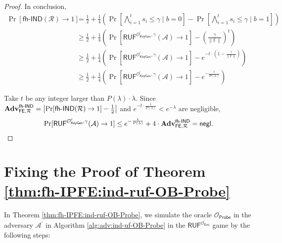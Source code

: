 \begin{proof}
In conclusion,
\begin{align*}
	\Pr[\textsf{fh-IND}(\mathcal{R}) \to 1] 
	&= \frac{1}{2} + \frac{1}{4} \left( \Pr \left[ \bigwedge_{i=1}^t s_i \leq \gamma \mid b = 0 \right] - \Pr \left[ \bigwedge_{i=1}^t s_i \leq \gamma \mid b = 1 \right] \right) \\
	&\geq \frac{1}{2} + \frac{1}{4} \left( \Pr[ \textsf{RUF}^{\mathcal{O}^\prime_{\textsf{KeyGen}}, \gamma}(\mathcal{A}) \to 1] - \left( \frac{\gamma}{\| \mathbb{F} \|} \right)^t \right) \\
	&\geq \frac{1}{2} + \frac{1}{4} \left( \Pr[ \textsf{RUF}^{\mathcal{O}^\prime_{\textsf{KeyGen}}, \gamma}(\mathcal{A}) \to 1] -  e^{- t \cdot (1 - \frac{\gamma}{\| \mathbb{F} \|}) } \right) \\
	&\geq \frac{1}{2} + \frac{1}{4} \left( \Pr[ \textsf{RUF}^{\mathcal{O}^\prime_{\textsf{KeyGen}}, \gamma}(\mathcal{A}) \to 1] -  e^{- \frac{t}{P(\lambda)} } \right)
\end{align*}

\noindent Take $t$ be any integer larger than $P(\lambda) \cdot \lambda$. Since $\mathbf{Adv}_{\textsf{FE}, \mathcal{R}}^\textsf{fh-IND} = \left| \Pr[\textsf{fh-IND}(\mathcal{R}) \to 1] - \frac{1}{2} \right|$ and $e^{-t \cdot \frac{1}{P(\lambda)}} < e^{-\lambda}$ are negligible,
\[
	\Pr[ \textsf{RUF}^{\mathcal{O}^\prime_{\textsf{KeyGen}}, \gamma}(\mathcal{A}) \to 1]  \leq e^{- \frac{t}{P(\lambda)} } + 4 \cdot \mathbf{Adv}_{\textsf{FE}, \mathcal{R}}^\textsf{fh-IND}  = \mathsf{negl}.
\]

\end{proof}


\newpage




\section{Fixing the Proof of Theorem \ref{thm:fh-IPFE:ind-ruf-OB-Probe}}

In Theorem \ref{thm:fh-IPFE:ind-ruf-OB-Probe}, we simulate the oracle $\mathcal{O}_{\textsf{Probe}}$ in the adversary $\mathcal{A}^\prime$ in Algorithm \ref{alg:adv:ind-uf-OB-Probe} in the $\textsf{RUF}^{ \mathcal{O}^\prime_{\textsf{Enc}} }$ game by the following steps:

